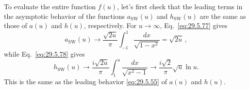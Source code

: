 To evaluate the entire function \(f(u)\), let's first check that the leading
terms in the asymptotic behavior of the functions \(a_{\mathrm{SW}}(u)\) and
\(h_{\mathrm{SW}}(u)\) are the same as those of \(a(u)\) and \(h(u)\),
respectively. For \(u\longrightarrow\infty\), Eq.~\eqref{eq:29.5.77} gives
\begin{equation}
  a_{\mathrm{SW}}(u)
  \longrightarrow\frac{\sqrt{2u}}{\pi}\int_{-1}^{1}
    \frac{dx}{\sqrt{1-x^2}}
  =\sqrt{2u}\,,
  \tag{29.5.84}\label{eq:29.5.84}
\end{equation}
while Eq.~\eqref{eq:29.5.78} gives
\begin{equation}
  h_{\mathrm{SW}}(u)
  \longrightarrow\frac{i\sqrt{2u}}{\pi}\int_1^u
    \frac{dx}{\sqrt{x^2-1}}
  \longrightarrow\frac{i\sqrt{2}}{\pi}\sqrt{u}\ln u.
  \tag{29.5.85}\label{eq:29.5.85}
\end{equation}
This is the same as the leading behavior \eqref{eq:29.5.55} of \(a(u)\) and
\(h(u)\).

